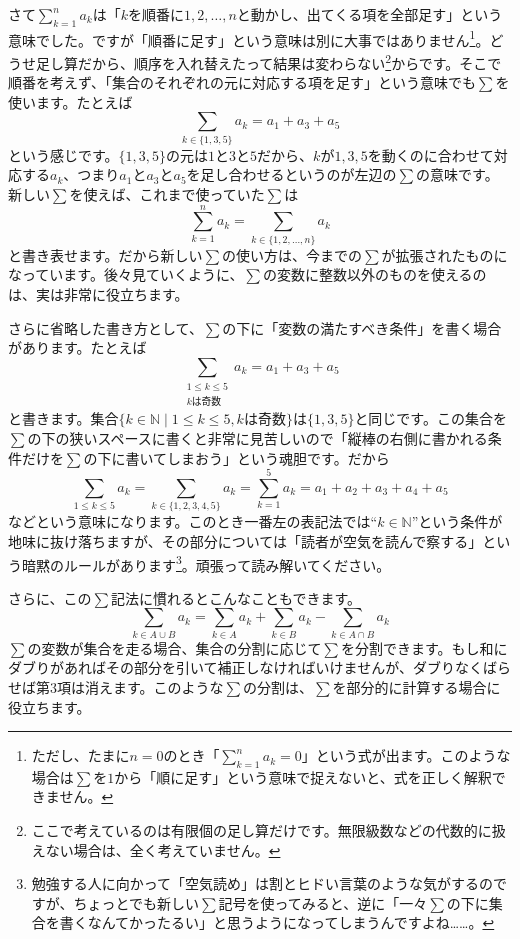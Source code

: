 さて$\sum_{k =1}^n a_k$は「$k$を順番に$1,2,\ldots,n$と動かし、出てくる項を全部足す」という意味でした。ですが「順番に足す」という意味は別に大事ではありません\footnote{ただし、たまに$n = 0$のとき「$\sum_{k = 1}^n a_k = 0$」という式が出ます。このような場合は$\sum$を$1$から「順に足す」という意味で捉えないと、式を正しく解釈できません。}。どうせ足し算だから、順序を入れ替えたって結果は変わらない\footnote{ここで考えているのは有限個の足し算だけです。無限級数などの代数的に扱えない場合は、全く考えていません。}からです。そこで順番を考えず、「集合のそれぞれの元に対応する項を足す」という意味でも$\sum$を使います。たとえば
\[
\sum_{k\in\{1,3,5\}} a_k = a_1 + a_3 + a_5
\]
という感じです。$\{1,3,5\}$の元は$1$と$3$と$5$だから、$k$が$1,3,5$を動くのに合わせて対応する$a_k$、つまり$a_1$と$a_3$と$a_5$を足し合わせるというのが左辺の$\sum$の意味です。新しい$\sum$を使えば、これまで使っていた$\sum$は
\[
\sum_{k = 1}^n a_k = \sum_{k\in\{1,2,\ldots,n\}} a_k
\]
と書き表せます。だから新しい$\sum$の使い方は、今までの$\sum$が拡張されたものになっています。後々見ていくように、$\sum$の変数に整数以外のものを使えるのは、実は非常に役立ちます。

さらに省略した書き方として、$\sum$の下に「変数の満たすべき条件」を書く場合があります。たとえば
\[
\sum_{\substack{1\leq k\leq 5\\ \text{$k$は奇数}}} a_k = a_1 + a_3 + a_5
\]
と書きます。集合$\{k\in\mathbb{N}\mid 1\leq k\leq 5, \text{$k$は奇数}\}$は$\{1,3,5\}$と同じです。この集合を$\sum$の下の狭いスペースに書くと非常に見苦しいので「縦棒の右側に書かれる条件だけを$\sum$の下に書いてしまおう」という魂胆です。だから
\[
\sum_{1\leq k\leq 5} a_k = \sum_{k\in\{1,2,3,4,5\}} a_k = \sum_{k = 1}^5 a_k = a_1 + a_2 + a_3 + a_4 + a_5
\]
などという意味になります。このとき一番左の表記法では``$k\in\mathbb{N}$''という条件が地味に抜け落ちますが、その部分については「読者が空気を読んで察する」という暗黙のルールがあります\footnote{勉強する人に向かって「空気読め」は割とヒドい言葉のような気がするのですが、ちょっとでも新しい$\sum$記号を使ってみると、逆に「一々$\sum$の下に集合を書くなんてかったるい」と思うようになってしまうんですよね……。}。頑張って読み解いてください。

さらに、この$\sum$記法に慣れるとこんなこともできます。
\[
\sum_{k \in A\cup B} a_k = \sum_{k \in A} a_k  + \sum_{k \in B} a_k - \sum_{k \in A\cap B} a_k
\]
$\sum$の変数が集合を走る場合、集合の分割に応じて$\sum$を分割できます。もし和にダブりがあればその部分を引いて補正しなければいけませんが、ダブりなくばらせば第$3$項は消えます。このような$\sum$の分割は、$\sum$を部分的に計算する場合に役立ちます。

